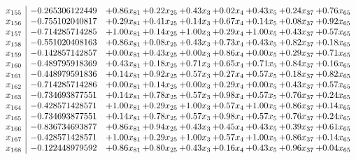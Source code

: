 \documentclass[8pt]{article}
\begin{document}
\[\begin{array}{c| c c@{\hskip 2pt} c@{\hskip 2pt} c@{\hskip 2pt} c@{\hskip 2pt} c@{\hskip 2pt} c@{\hskip 2pt} c@{\hskip 2pt} }
 x_{155}   &  -0.265306122449 & +  0.86 x_{81} & +  0.22 x_{25} & +  0.43 x_{3} & +  0.02 x_{4} & +  0.43 x_{5} & +  0.24 x_{37} & +  0.76 x_{65}\\
 x_{156}   &  -0.755102040817 & +  0.29 x_{81} & +  0.41 x_{25} & +  0.14 x_{3} & +  0.67 x_{4} & +  0.14 x_{5} & +  0.08 x_{37} & +  0.92 x_{65}\\
 x_{157}   &  -0.714285714285 & +  1.00 x_{81} & +  0.14 x_{25} & +  1.00 x_{3} & +  0.29 x_{4} & +  1.00 x_{5} & +  0.43 x_{37} & +  0.57 x_{65}\\
 x_{158}   &  -0.551020408163 & +  0.86 x_{81} & +  0.08 x_{25} & +  0.43 x_{3} & +  0.73 x_{4} & +  0.43 x_{5} & +  0.82 x_{37} & +  0.18 x_{65}\\
 x_{159}   &  -0.142857142857 & +  0.00 x_{81} & +  0.43 x_{25} & +  0.00 x_{3} & +  0.86 x_{4} & +  0.00 x_{5} & +  0.29 x_{37} & +  0.71 x_{65}\\
 x_{160}   &  -0.489795918369 & +  0.43 x_{81} & +  0.18 x_{25} & +  0.71 x_{3} & +  0.65 x_{4} & +  0.71 x_{5} & +  0.84 x_{37} & +  0.16 x_{65}\\
 x_{161}   &  -0.448979591836 & +  0.14 x_{81} & +  0.92 x_{25} & +  0.57 x_{3} & +  0.27 x_{4} & +  0.57 x_{5} & +  0.18 x_{37} & +  0.82 x_{65}\\
 x_{162}   &  -0.714285714286 & +  0.00 x_{81} & +  0.14 x_{25} & +  0.00 x_{3} & +  0.29 x_{4} & +  0.00 x_{5} & +  0.43 x_{37} & +  0.57 x_{65}\\
 x_{163}   &  -0.734693877551 & +  0.14 x_{81} & +  0.78 x_{25} & +  0.57 x_{3} & +  0.98 x_{4} & +  0.57 x_{5} & +  0.76 x_{37} & +  0.24 x_{65}\\
 x_{164}   &  -0.428571428571 & +  1.00 x_{81} & +  0.29 x_{25} & +  1.00 x_{3} & +  0.57 x_{4} & +  1.00 x_{5} & +  0.86 x_{37} & +  0.14 x_{65}\\
 x_{165}   &  -0.734693877551 & +  0.14 x_{81} & +  0.78 x_{25} & +  0.57 x_{3} & +  0.98 x_{4} & +  0.57 x_{5} & +  0.76 x_{37} & +  0.24 x_{65}\\
 x_{166}   &  -0.836734693877 & +  0.86 x_{81} & +  0.94 x_{25} & +  0.43 x_{3} & +  0.45 x_{4} & +  0.43 x_{5} & +  0.39 x_{37} & +  0.61 x_{65}\\
 x_{167}   &  -0.428571428571 & +  1.00 x_{81} & +  0.29 x_{25} & +  1.00 x_{3} & +  0.57 x_{4} & +  1.00 x_{5} & +  0.86 x_{37} & +  0.14 x_{65}\\
 x_{168}   &  -0.122448979592 & +  0.86 x_{81} & +  0.80 x_{25} & +  0.43 x_{3} & +  0.16 x_{4} & +  0.43 x_{5} & +  0.96 x_{37} & +  0.04 x_{65}\\

\end{array}\]
\end{document}
